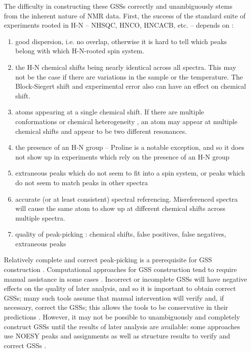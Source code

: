 The difficulty in constructing these GSSs correctly and unambiguously stems 
from the inherent nature of NMR data.  First, the success of the standard 
suite of experiments rooted in H-N -- NHSQC, HNCO, HNCACB, etc. -- depends 
on \cite{autoassign1997}: %
\begin{enumerate}
  \item good dispersion, i.e. no overlap, otherwise it is hard to tell which 
  peaks belong with which H-N-rooted spin system.
  \item the H-N chemical shifts being nearly identical across all spectra.  
  This may not be the case if there are variations in the sample or the 
  temperature.  The Block-Siegert shift and experimental error also can have 
  an effect on chemical shift.
  \item atoms appearing at a single chemical shift.  If there are multiple 
  conformations or chemical heterogeneity \cite{autoassign1997}, 
  an atom may appear at multiple chemical shifts and appear to be two 
  different resonances.
  \item the presence of an H-N group -- Proline is a notable exception, and 
  so it does not show up in experiments which rely on the presence of an H-N group
  \item extraneous peaks which do not seem to fit into a spin system, or 
  peaks which do not seem to match peaks in other spectra
  \item accurate (or at least consistent) spectral referencing.  
  Misreferenced spectra will cause the same atom to show up at different 
  chemical shifts across multiple spectra.
  \item quality of peak-picking \cite{autoassign1997}: 
  chemical shifts, false positives, false negatives, extraneous peaks
\end{enumerate}

Relatively complete and correct peak-picking is a prerequisite for GSS 
construction \cite{mars}.  Computational approaches 
for GSS construction tend to require manual assistance in some cases 
\cite{autoassign1997, mars}.  Incorrect or 
incomplete GSSs will have negative effects on the quality of later 
analysis, and so it is important to obtain correct GSSs; many such 
tools assume that manual intervention will verify and, if necessary, 
correct the GSSs; this allows the tools to be conservative in their 
predictions \cite{autoassign1997}.  However, it may not be 
possible to unambiguously and completely construct GSSs until the results 
of later analysis are available: some approaches use NOESY peaks and 
assignments as well as structure results to verify and correct GSSs 
\cite{autoassign1997}.


